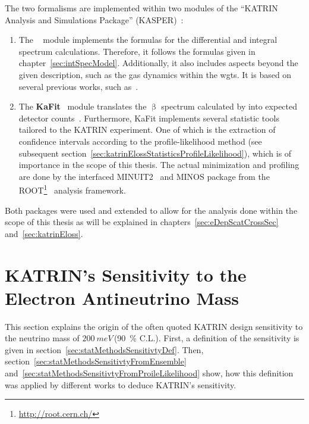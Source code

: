 The two formalisms are implemented within two modules of the ``KATRIN Analysis and Simulations Package'' (KASPER)~\cite{Kasper}:\mynobreakpar
\begin{enumerate}
	\item The \textbf{}~\cite{SSC} module implements the formulas for the differential and integral spectrum calculations. Therefore, it follows the formulas given in chapter~\ref{sec:intSpecModel}. Additionally, it also includes aspects beyond the given description, such as the gas dynamics within the \gls{wgts}. It is based on several previous works, such as~\cite{Hoetzel2012, Groh2015, Kleesiek2019, Kaefer2012, Heizmann2018, Kuckert2018}.
	\item The \textbf{KaFit}~\cite{KaFit} module translates the $\upbeta$ spectrum calculated by  into expected detector counts~\cite{Kleesiek2014}. Furthermore, KaFit implements several statistic tools tailored to the KATRIN experiment. One of which is the extraction of confidence intervals according to the profile-likelihood method (see subsequent section~\ref{sec:katrinElossStatisticsProfileLikelihood}), which is of importance in the scope of this thesis. The actual minimization and profiling are done by the interfaced MINUIT2~\cite{James1998} and MINOS package from the ROOT\footnote{\url{http://root.cern.ch/}}~\cite{ANTCHEVA2009} analysis framework.
\end{enumerate}

Both packages were used and extended to allow for the analysis done within the scope of this thesis as will be explained in chapters~\ref{sec:eDepScatCrossSec} and~\ref{sec:katrinEloss}.

\section{KATRIN's Sensitivity to the Electron Antineutrino Mass}
\label{sec:statMethodsKatrinSensitivity}
This section explains the origin of the often quoted KATRIN design sensitivity to the neutrino mass of $\SI{200}{meV}$\,(\SI{90}{\percent} C.L.). First, a definition of the sensitivity is given in section~\ref{sec:statMethodsSensitivtyDef}. Then, section~\ref{sec:statMethodsSensitivtyFromEnsemble} and~\ref{sec:statMethodsSensitivtyFromProileLikelihood} show, how this definition was applied by different works to deduce KATRIN's sensitivity.

